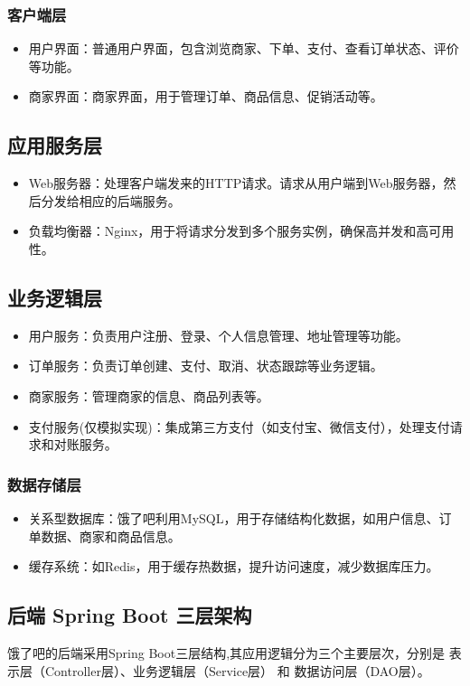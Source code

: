 \subsubsection{客户端层}
\begin{itemize}
    \item 用户界面：普通用户界面，包含浏览商家、下单、支付、查看订单状态、评价等功能。
    \item 商家界面：商家界面，用于管理订单、商品信息、促销活动等。
\end{itemize}
\subsection{应用服务层}
\begin{itemize}
    \item Web服务器：处理客户端发来的HTTP请求。请求从用户端到Web服务器，然后分发给相应的后端服务。
    \item 负载均衡器：Nginx，用于将请求分发到多个服务实例，确保高并发和高可用性。
\end{itemize}
\subsection{业务逻辑层}
\begin{itemize}
    \item 用户服务：负责用户注册、登录、个人信息管理、地址管理等功能。
    \item 订单服务：负责订单创建、支付、取消、状态跟踪等业务逻辑。
    \item 商家服务：管理商家的信息、商品列表等。
    \item 支付服务(仅模拟实现)：集成第三方支付（如支付宝、微信支付），处理支付请求和对账服务。
\end{itemize}
\subsubsection{数据存储层}
\begin{itemize}
    \item 关系型数据库：饿了吧利用MySQL，用于存储结构化数据，如用户信息、订单数据、商家和商品信息。
    \item 缓存系统：如Redis，用于缓存热数据，提升访问速度，减少数据库压力。
\end{itemize}

\subsection{后端 Spring Boot 三层架构}
饿了吧的后端采用Spring Boot三层结构,其应用逻辑分为三个主要层次，分别是 表示层（Controller层）、业务逻辑层（Service层） 和 数据访问层（DAO层）。


